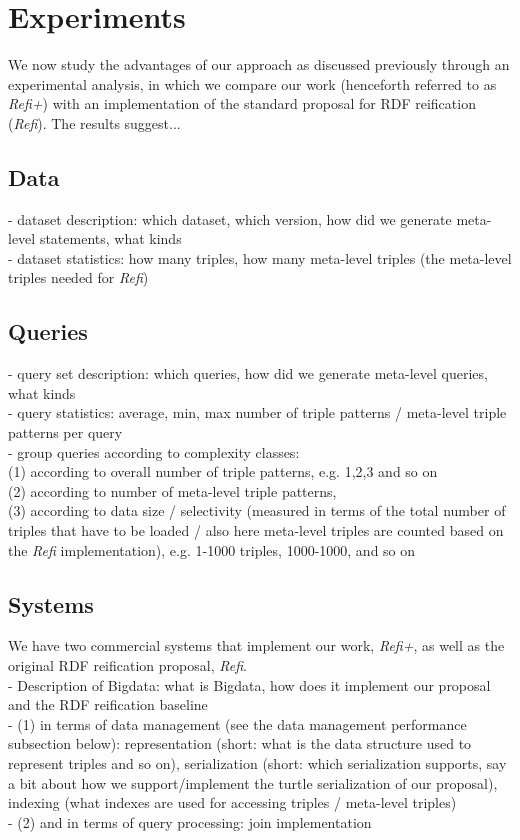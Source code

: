 \section{Experiments} \label{Section:Experiments}
We now study the advantages of our approach as discussed previously through an experimental analysis, in which we compare our work (henceforth referred to as \emph{Refi+}) with an implementation of the standard proposal for RDF reification (\emph{Refi}). The results suggest... 

\subsection{Data}
-	dataset description: which dataset, which version, how did we generate meta-level statements, what kinds\\
- dataset statistics: how many triples, how many meta-level triples (the meta-level triples needed for \emph{Refi}) \\

\subsection{Queries}
-	query set description: which queries, how did we generate meta-level queries, what kinds\\
- query statistics: average, min, max number of triple patterns / meta-level triple patterns per query\\
- group queries according to complexity classes:\\
(1) according to overall number of triple patterns, e.g. 1,2,3 and so on \\
(2) according to number of meta-level triple patterns, \\
(3) according to data size / selectivity (measured in terms of the total number of triples that have to be loaded / also here meta-level triples are counted based on the \emph{Refi} implementation), e.g. 1-1000 triples, 1000-1000, and so on\\

\subsection{Systems}
We have two commercial systems that implement our work, \emph{Refi+}, as well as the original RDF reification proposal, \emph{Refi}.\\

- Description of Bigdata: what is Bigdata, how does it implement our proposal and the RDF reification baseline\\
- (1) in terms of data management (see the data management performance subsection below): representation (short: what is the data structure used to represent triples and so on), serialization (short: which serialization supports, say a bit about how we support/implement the turtle serialization of our proposal), indexing (what indexes are used for accessing triples /  meta-level triples)\\
- (2) and in terms of query processing: join implementation\\

